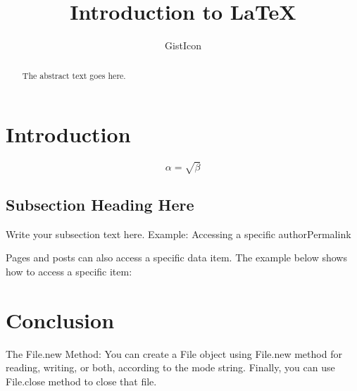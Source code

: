\documentclass{article}
\begin{document}
\title{Introduction to \LaTeX{}}
\author{GistIcon}

\maketitle

\begin{abstract}
The abstract text goes here.
\end{abstract}

\section{Introduction}


\begin{equation}
    \label{simple_equation}
    \alpha = \sqrt{ \beta }
\end{equation}

\subsection{Subsection Heading Here}
Write your subsection text here.
Example: Accessing a specific authorPermalink

Pages and posts can also access a specific data item. The example below shows how to access a specific item:


\section{Conclusion}
The File.new Method:
You can create a File object using File.new method for reading, writing, or both, according to the mode string. Finally, you can use File.close method to close that file.
\end{document}
